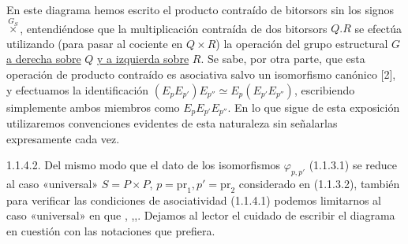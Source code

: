 En este diagrama hemos escrito el producto contraído de bitorsors sin
los signos $\overset{G_S}{\times}$, entendiéndose que la multiplicación
contraída de dos bitorsors $Q.R$ se efectúa utilizando (para pasar al
cociente en $Q\times R$) la operación del grupo estructural $G$
\underline{a derecha sobre} $Q$ \underline{y a izquierda sobre} $R$.
Se sabe, por otra parte, que esta operación de producto contraído es
asociativa salvo un isomorfismo canónico [2], y efectuamos la
identificación $(E_{p}E_{p'})E_{p''} \simeq
E_{p}(E_{p'}E_{p''})$, escribiendo simplemente ambos miembros como
$E_{p}E_{p'}E_{p''}$. En lo que sigue de esta exposición utilizaremos
convenciones evidentes de esta naturaleza sin señalarlas expresamente
cada vez.

1.1.4.2.  Del mismo modo que el dato de los isomorfismos
$\varphi_{p,p'}$ (1.1.3.1) se reduce al caso «universal»
$S=P\times P$, $p=\mathrm{pr}_1,p' = \mathrm{pr}_2$ considerado en (1.1.3.2), también
para verificar las condiciones de asociatividad (1.1.4.1) podemos
limitarnos al caso «universal» en que ,
,,. Dejamos al lector el cuidado de escribir
el diagrama en cuestión con las notaciones que prefiera.
